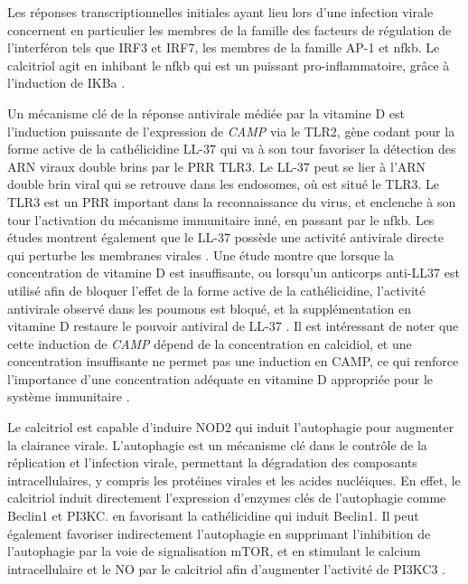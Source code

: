 \documentclass[
  a4paper,
  DIV=11,
  numbers=noendperiod,
  listof=totoc]{scrreprt}
\begin{document}
Les réponses transcriptionnelles initiales ayant lieu lors d'une
infection virale concernent en particulier les membres de la famille des
facteurs de régulation de l'interféron tels que IRF3 et IRF7, les
membres de la famille AP-1 et \ac{nfkb}. Le calcitriol agit en inhibant
le \ac{nfkb} qui est un puissant pro-inflammatoire, grâce à l'induction
de \ac{IKBa} \autocite{Bishop.2021}.

Un mécanisme clé de la réponse antivirale médiée par la vitamine D est
l'induction puissante de l'expression de \emph{CAMP} via le TLR2, gène
codant pour la forme active de la cathélicidine LL-37 qui va à son tour
favoriser la détection des ARN viraux double brins par le \ac{PRR} TLR3.
Le LL-37 peut se lier à l'ARN double brin viral qui se retrouve dans les
endosomes, où est situé le TLR3. Le TLR3 est un \ac{PRR} important dans
la reconnaissance du virus, et enclenche à son tour l'activation du
mécanisme immunitaire inné, en passant par le \ac{nfkb}. Les études
montrent également que le LL-37 possède une activité antivirale directe
qui perturbe les membranes virales \autocite{Bishop.2021}. Une étude
montre que lorsque la concentration de vitamine D est insuffisante, ou
lorsqu'un anticorps anti-LL37 est utilisé afin de bloquer l'effet de la
forme active de la cathélicidine, l'activité antivirale observé dans les
poumons est bloqué, et la supplémentation en vitamine D restaure le
pouvoir antiviral de LL-37 \autocite{Buonfiglio.2017}. Il est
intéressant de noter que cette induction de \emph{CAMP} dépend de la
concentration en calcidiol, et une concentration insuffisante ne permet
pas une induction en CAMP, ce qui renforce l'importance d'une
concentration adéquate en vitamine D appropriée pour le système
immunitaire \autocite{White.2022}.

Le calcitriol est capable d'induire NOD2 qui induit l'autophagie pour
augmenter la clairance virale. L'autophagie est un mécanisme clé dans le
contrôle de la réplication et l'infection virale, permettant la
dégradation des composants intracellulaires, y compris les protéines
virales et les acides nucléiques. En effet, le calcitriol induit
directement l'expression d'enzymes clés de l'autophagie comme Beclin1 et
PI3KC. en favorisant la cathélicidine qui induit Beclin1. Il peut
également favoriser indirectement l'autophagie en supprimant
l'inhibition de l'autophagie par la voie de signalisation mTOR, et en
stimulant le calcium intracellulaire et le \ac{NO} par le calcitriol
afin d'augmenter l'activité de PI3KC3 \autocite{Bishop.2021}.
\end{document}
